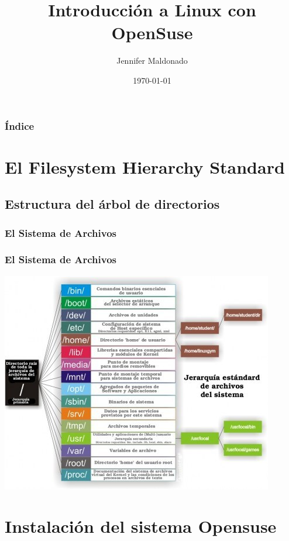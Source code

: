 \documentclass{beamer}
\title{Introducci\'on a Linux con OpenSuse}
\author{Jennifer Maldonado}
\date{\today}
\begin{document}
\begin{frame}
\titlepage
\end{frame}
\setcounter{tocdepth}{1}
\begin{frame}[allowframebreaks]
\frametitle{\'Indice}
\tableofcontents
\end{frame}
\section{El Filesystem Hierarchy Standard}
\subsection{Estructura del \'arbol de directorios}
\begin{frame}
\setcounter{tocdepth}{3}
\tableofcontents[currentsection]
\frametitle{El Sistema de Archivos}
\end{frame} 
\begin{frame}
\frametitle{El Sistema de Archivos}
\includegraphics[height=0.8\textheight]{fhs-esp.jpg} \hspace*{7.3cm}
\end{frame} 
\section{Instalaci\'on del sistema Opensuse}
\end{document}
